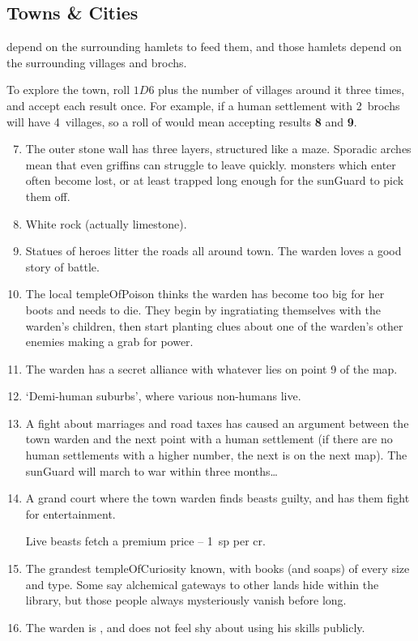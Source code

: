 \begin{multicols}{2}

\subsection{Towns \& Cities}
\label{mapTown}
depend on the surrounding hamlets to feed them, and those hamlets depend on the surrounding \glspl{village} and \glspl{broch}.

To explore the town, roll $1D6$ plus the number of \glspl{village} around it three times, and accept each result once.
For example, if a human settlement with 2~\glspl{broch} will have 4~\glspl{village}, so a roll of    would mean accepting results \textbf{8} and \textbf{9}.

\begin{enumerate}
\setcounter{enumi}{6}
  \item
  The outer stone wall has three layers, structured like a maze.
  Sporadic arches mean that even griffins can struggle to leave quickly.
  \Glspl{monster} which enter often become lost, or at least trapped long enough for the \gls{sunGuard} to pick them off.
  \item
  White rock (actually limestone).
  \item
  Statues of heroes litter the roads all around town.
  The \gls{warden} loves a good story of battle.
  \item
  The local \gls{templeOfPoison} thinks the \gls{warden} has become too big for her boots and needs to die.
  They begin by ingratiating themselves with the \gls{warden}'s children, then start planting clues about one of the \gls{warden}'s other enemies making a grab for power.
  \item
  The \gls{warden} has a secret alliance with whatever lies on point 9 of the map.
  \item
  `Demi-human suburbs', where various non-humans live.
  \item
  A fight about marriages and road taxes has caused an argument between the town \gls{warden} and the next point with a human settlement (if there are no human settlements with a higher number, the next is on the next map).
  The \gls{sunGuard} will march to war within three months\ldots
  \item
  A grand \gls{court} where the town \gls{warden} finds beasts guilty, and has them fight for entertainment.

  Live beasts fetch a premium price -- 1~\gls{sp} per \gls{cr}.
  \item
  The grandest \gls{templeOfCuriosity} known, with books (and soaps) of every size and type.
  Some say alchemical gateways to other lands hide within the library, but those people always mysteriously vanish before long.
  \item
  The \gls{warden} is , and does not feel shy about using his skills publicly.
\end{enumerate}


\end{multicols}
